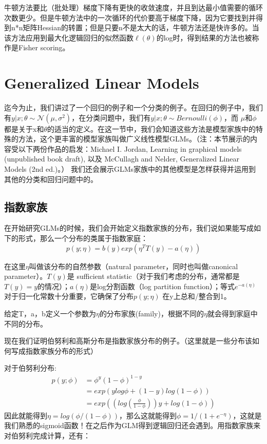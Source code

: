 \documentclass[UTF8]{ctexart}
\begin{document}
牛顿方法要比（批处理）梯度下降有更快的收敛速度，并且到达最小值需要的循环次数更少。但是牛顿方法中的一次循环的代价要高于梯度下降，因为它要找到并得到n*n矩阵Hessian的转置；但是只要n不是太大的话，牛顿方法还是快许多的。当该方法应用到最大化逻辑回归的似然函数$\ell(\theta)$的log时，得到结果的方法也被称作是Fisher scoring。




\section{Generalized Linear Models}

迄今为止，我们讲过了一个回归的例子和一个分类的例子。在回归的例子中，我们有$y|x;\theta \sim \mathcal{N}(\mu,\sigma^{2})$，在分类问题中，我们有$y|x;\theta \sim Bernoulli(\phi)$，而 $\mu 和\phi$ 都是关于x和$\theta$的适当的定义。在这一节中，我们会知道这些方法是模型家族中的特殊的方法，这个更丰富的模型家族叫做广义线性模型GLMs。（注：本节展示的内容受以下两份作品的启发：Michael I. Jordan, Learning in graphical models (unpublished book draft), 以及 McCullagh and Nelder, Generalized Linear Models (2nd ed.)。）
我们还会展示GLMs家族中的其他模型是怎样获得并运用到其他的分类和回归问题中的。

\subsection{指数家族}

在开始研究GLMs的时候，我们会开始定义指数家族的分布，我们说如果能写成如下的形式，那么一个分布的类属于指数家庭：\[p(y;\eta) = b(y) exp(\eta^{T}T(y) - a(\eta)) \]

在这里$\eta$叫做该分布的自然参数（natural parameter，同时也叫做canonical parameter）。$T(y)$是 sufficient statistic（对于我们考虑的分布，通常都是$T(y)=y$的情况）；$a(\eta)$是log分割函数（log partition function）；等式$e^{-a(\eta)}$对于归一化常数十分重要，它确保了分布$p(y;\eta)$ 在y上总和/整合到1。


给定T，a，b定义一个参数为$\eta$的分布家族(family)，根据不同的$\eta$就会得到家庭中不同的分布。

现在我们证明伯努利和高斯分布是指数家族分布的例子。（这里就是一些分布该如何写成指数家族分布的形式）

对于伯努利分布:
\begin{align*}
p(y;\phi) & = \phi^{y}(1-\phi)^{1-y} \\
& = exp(y log\phi + (1-y)log(1-\phi)) \\
& = exp((log(\frac{\phi}{1-\phi}))y+log(1-\phi))
\end{align*}
因此就能得到$\eta = log(\phi/(1-\phi))$，那么这就能得到$\phi = 1/(1+e^{-\eta})$，这就是我们熟悉的sigmoid函数！在之后作为GLM得到逻辑回归还会遇到。用指数家族来对伯努利完成计算，还有：
\end{document}

